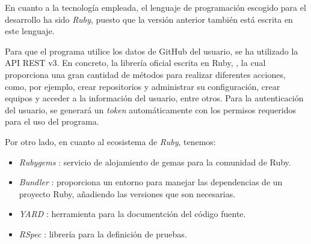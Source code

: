 En cuanto a la tecnología empleada, el lenguaje de programación escogido para el desarrollo ha sido {\it Ruby},
puesto que la versión anterior también está escrita en este lenguaje.
\bigskip

Para que el programa utilice los datos de GitHub del usuario, se ha utilizado la API REST v3. En concreto,
la librería oficial escrita en Ruby, \cite{B4}, la cual proporciona una gran cantidad de métodos para realizar diferentes acciones, como, por ejemplo,
crear repositorios y administrar su configuración, crear equipos y acceder a la información del usuario, entre otros.
Para la autenticación del usuario, se generará un {\it token} automáticamente con los permisos requeridos para el uso del programa.

Por otro lado, en cuanto al ecosistema de {\it Ruby}, tenemos:
\begin{itemize}
  \item {\it Rubygems} \cite{B5}: servicio de alojamiento de gemas para la comunidad de Ruby.
  \item {\it Bundler} \cite{B6}: proporciona un entorno para manejar las dependencias de un proyecto Ruby, añadiendo las versiones que son necesarias.
  \item {\it YARD} \cite{B7}: herramienta para la documentción del código fuente.
  \item {\it RSpec} \cite{B8}: librería para la definición de pruebas.
\end{itemize}
